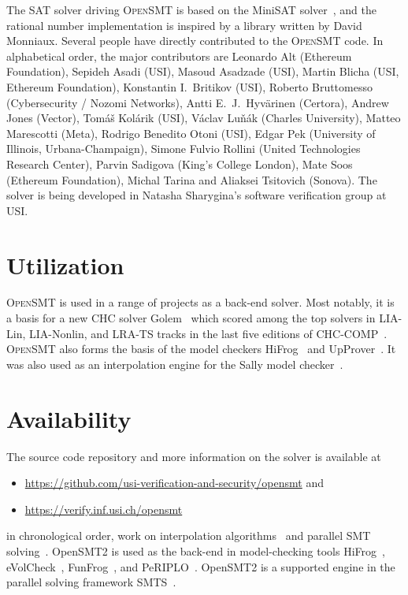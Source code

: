 \documentclass{easychair}
\newcommand{\opensmt}{\textsc{OpenSMT}\xspace}
\begin{document}
The SAT solver driving \opensmt is based on the MiniSAT
solver~\cite{EenS:SAT03}, and the rational number implementation is
inspired by a library written by David Monniaux.  Several people have
directly contributed to the \opensmt code.  In alphabetical order, the
major contributors are
%
Leonardo Alt (Ethereum Foundation),
Sepideh Asadi (USI),
Masoud Asadzade (USI),
Martin Blicha (USI, Ethereum Foundation),
Konstantin I.~Britikov (USI),
Roberto Bruttomesso (Cybersecurity / Nozomi Networks),
Antti E.~J.~Hyv{\"a}rinen (Certora),
Andrew Jones (Vector),
Tomáš Kolárik (USI),
Václav Luňák (Charles University),
Matteo Marescotti (Meta),
Rodrigo Benedito Otoni (USI),
Edgar Pek (University of Illinois, Urbana-Champaign),
Simone Fulvio Rollini (United Technologies Research Center),
Parvin Sadigova (King's College London),
Mate Soos (Ethereum Foundation),
Michal Tarina
and Aliaksei Tsitovich (Sonova).
%
The solver is being developed in Natasha Sharygina's software
verification group at USI.

\section{Utilization}

\opensmt is used in a range of projects as a back-end solver.
Most notably, it is a basis for a new CHC solver Golem~\cite{BlichaBS:CAV23} which scored among the top solvers
in LIA-Lin, LIA-Nonlin, and LRA-TS tracks in the last five editions of CHC-COMP~\cite{Rummer_2020,Rummer_2021,De_Angelis_2022,CHC-COMP23,CHC-COMP24}.
\opensmt also forms the basis of the model checkers HiFrog~\cite{AltACMFHS17} and
UpProver~\cite{Asadi_2020b}.
It was also used as an interpolation engine for the Sally model
checker~\cite{JovanovicD:FMCAD16}.

\section{Availability}
The source code repository and more information on the solver is
available at

\begin{itemize}
    \item \url{https://github.com/usi-verification-and-security/opensmt}
        and
    \item \url{https://verify.inf.usi.ch/opensmt}
\end{itemize}

\iffalse
in chronological order, work on interpolation
algorithms~\cite{BlichaHKS19,AltHAS17,JancikAFHKS16,AsadiBFHESC18}
and parallel SMT
solving~\cite{HyvarinenMSCS18,MarescottiHS18,HyvarinenMS:SAT15}.
OpenSMT2 is
used as the back-end in model-checking tools
HiFrog~\cite{AltACMFHS17},
eVolCheck~\cite{FSS_TACAS13},
FunFrog~\cite{SFS_ATVA12}, and
PeRIPLO~\cite{RolliniAFHS:LPAR2013,AltFHS:VSTTE2015}.
OpenSMT2 is a supported engine in the parallel
solving framework SMTS~\cite{MarescottiHS16}.
\end{document}
